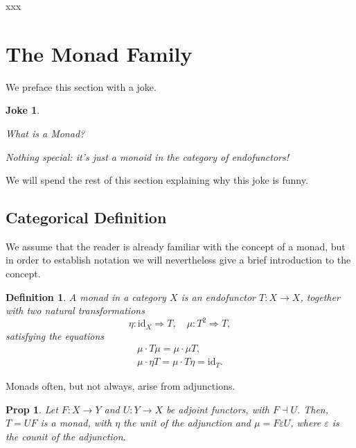 \documentclass[11pt]{article}
\newtheorem{prop}{Prop}
\newtheorem{definition}{Definition}
\newtheorem{joke}{Joke}
\theoremstyle{nonumberplain}
\newcommand{\id}{\mathrm{id}}
\newcommand{\nto}{\Rightarrow}
\begin{document}
xxx


\section{The Monad Family}

We preface this section with a joke.

\begin{joke}
\leavevmode
\begin{description}[labelindent=\parindent]
\item[Novice learning Haskell:] What is a Monad?

\item[Haskell expert:] Nothing special: it's just a monoid in the category of endofunctors!
\end{description}
\end{joke}

We will spend the rest of this section explaining why this joke is funny.

\subsection{Categorical Definition}

We assume that the reader is already familiar with the concept of a monad, but in order to establish notation we will nevertheless give a brief introduction to the concept.

\begin{definition}
A monad in a category $X$ is an endofunctor $T \colon X \to X$, together with two natural transformations
\begin{equation}
\eta \colon \id_X \nto T, \quad \mu \colon T^2 \nto T,
\end{equation}
satisfying the equations
\begin{gather}
\mu \cdot T\mu = \mu \cdot \mu T,\\
\mu \cdot \eta T = \mu \cdot T \eta = \id_T.
\end{gather}
\end{definition}

Monads often, but not always, arise from adjunctions.

\begin{prop}
Let $F \colon X \to Y$ and $U \colon Y \to X$ be adjoint functors, with $F \dashv U$. Then, $T = UF$ is a monad, with $\eta$ the unit of the adjunction and $\mu = F \varepsilon U$, where $\varepsilon$ is the counit of the adjunction.
\end{prop}
\end{document}

